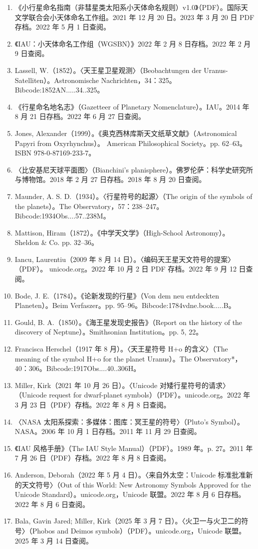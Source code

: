 \begin{enumerate}
\item 《小行星命名指南（非彗星类太阳系小天体命名规则）v1.0》（PDF）。国际天文学联合会小天体命名工作组。2021 年 12 月 20 日。2023 年 3 月 20 日 PDF 存档。2022 年 5 月 1 日查阅。
\item 《IAU：小天体命名工作组（WGSBN）》2022 年 2 月 8 日存档。2022 年 2 月 9 日查阅。
\item Lassell, W.（1852）。〈天王星卫星观测〉（Beobachtungen der Uranus-Satelliten）。Astronomische Nachrichten，34：325。Bibcode:1852AN.....34..325。
\item 《行星命名地名志》（Gazetteer of Planetary Nomenclature）。IAU。2014 年 8 月 21 日存档。2022 年 6 月 27 日查阅。
\item Jones, Alexander（1999）。《奥克西林库斯天文纸草文献》（Astronomical Papyri from Oxyrhynchus）。
American Philosophical Society。pp. 62–63。ISBN 978-0-87169-233-7。
\item 〈比安基尼天球平面图〉（Bianchini's planisphere）。佛罗伦萨：科学史研究所与博物馆。2018 年 2 月 27 日存档。2018 年 8 月 20 日查阅。
\item Maunder, A. S. D.（1934）。〈行星符号的起源〉（The origin of the symbols of the planets）。The Observatory，57：238–247。Bibcode:1934Obs....57..238M。
\item Mattison, Hiram（1872）。《中学天文学》（High-School Astronomy）。
Sheldon & Co. pp. 32–36。
\item Iancu, Laurentiu（2009 年 8 月 14 日）。〈编码天王星天文符号的提案〉（PDF）。
unicode.org。2022 年 10 月 2 日 PDF 存档。2022 年 9 月 12 日查阅。
\item Bode, J. E.（1784）。《论新发现的行星》（Von dem neu entdeckten Planeten）。Beim Verfaszer。pp. 95–96。Bibcode:1784vdne.book.....B。
\item Gould, B. A.（1850）。《海王星发现史报告》（Report on the history of the discovery of Neptune）。Smithsonian Institution。pp. 5, 22。
\item Francisca Herschel（1917 年 8 月）。〈天王星符号 H+o 的含义〉（The meaning of the symbol H+o for the planet Uranus）。The Observatory*，40：306。Bibcode:1917Obs....40..306H。
\item Miller, Kirk（2021 年 10 月 26 日）。〈Unicode 对矮行星符号的请求〉（Unicode request for dwarf-planet symbols）（PDF）。unicode.org。2022 年 3 月 23 日（PDF）存档。2022 年 8 月 8 日查阅。
\item 〈NASA 太阳系探索：多媒体：图库：冥王星的符号〉（Pluto's Symbol）。NASA。2006 年 10 月 1 日存档。2011 年 11 月 29 日查阅。
\item 《IAU 风格手册》（The IAU Style Manual）（PDF）。1989 年。p. 27。2011 年 7 月 26 日（PDF）存档。2022 年 8 月 8 日查阅。
\item Anderson, Deborah（2022 年 5 月 4 日）。〈来自外太空：Unicode 标准批准新的天文符号〉（Out of this World: New Astronomy Symbols Approved for the Unicode Standard）。unicode.org，Unicode 联盟。2022 年 8 月 6 日存档。2022 年 8 月 6 日查阅。
\item Bala, Gavin Jared; Miller, Kirk（2025 年 3 月 7 日）。〈火卫一与火卫二的符号〉（Phobos and Deimos symbols）（PDF）。unicode.org，Unicode 联盟。2025 年 3 月 14 日查阅。
\end{enumerate}
